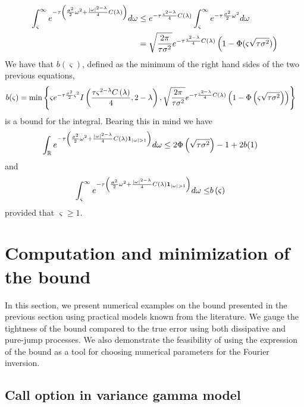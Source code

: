 \documentclass[11pt]{amsart}
\begin{document}
\begin{align}
\int_{\varsigma}^\infty e^{-\tau \left( { \frac{\sigma^2}{2}\omega^2 + \frac{|\omega|^{2 - \lambda}}{4} C \left( {\lambda} \right)} \right) } d\omega
& \leq e^{-\tau \frac{\varsigma^{2 - \lambda}}{4} C \left( {\lambda} \right)} \int_{\varsigma}^\infty e^{-\tau \frac{\sigma^2}{2}\omega^2} d\omega \\
& =\sqrt{\frac{2 \pi}{\tau \sigma^2}} e^{-\tau \frac{\varsigma^{2 - \lambda}}{4} C \left( {\lambda} \right)} \left( {1-\Phi(\varsigma\sqrt{\tau \sigma^2})} \right)\notag
\end{align}
We have that $b(\varsigma)$, defined as the minimum of the right hand sides of the two previous equations,
\begin{align*}
b(\varsigma)=\min & \left\{ \varsigma e^{-\tau \frac{\sigma^2}{2}\varsigma^2}  I \left( {\frac{\tau \varsigma^{2-\lambda}C \left( {\lambda} \right)}{4},2-\lambda} \right), \sqrt{\frac{2 \pi}{\tau \sigma^2}} e^{-\tau \frac{\varsigma^{2 - \lambda}}{4} C \left( {\lambda} \right)} \left( {1-\Phi\left( {\varsigma\sqrt{\tau \sigma^2}} \right)} \right) \right\}
\end{align*}
is a bound for the integral. Bearing this in mind we have
\begin{align}
\int_{\R} \expfs{-\tau \parent{ \frac{\sigma^2}{2}\omega^2 + \frac{|\omega|^{2 - \lambda}}{4} \cl\indicator_{\absval{\omega}>1}} } d\omega
& \leq 2 \Phi\parent{\sqrt{\tau\sigma^2}}-1 + 2 b(1)
\end{align}
and
\begin{align}
\int_{\varsigma}^{\infty} \expfs{-\tau \parent{ \frac{\sigma^2}{2}\omega^2 + \frac{|\omega|^{2 - \lambda}}{4} \cl\indicator_{\absval{\omega}>1}} } d\omega
\leq & b\parent{\varsigma}
\end{align}
provided that $\varsigma\geq 1$.

\section{Computation and minimization of the bound}
\label{section:Numerics}

In this section, we present numerical examples on the
bound presented in the previous section using practical
models known from the literature.
We gauge the tightness of the bound compared to the
true error using both dissipative and pure-jump processes.
We also demonstrate the feasibility of using the expression of the bound
as a tool for choosing numerical parameters
for the Fourier inversion.

\subsection{Call option in variance gamma model}
\end{document}
